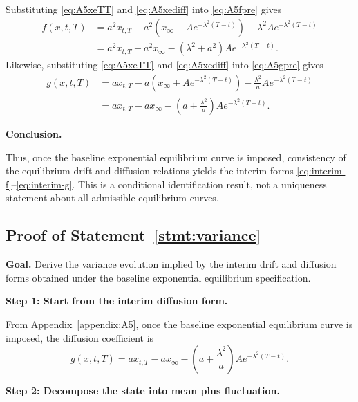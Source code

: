 \documentclass[12pt]{article}
\theoremstyle{statementstyle}
\begin{document}
\begin{appendices}
Substituting \eqref{eq:A5xeTT} and \eqref{eq:A5xediff} into
\eqref{eq:A5fpre} gives
\begin{align}
f(x,t,T)
&=
a^{2}x_{t,T}
-
a^{2}\!\left(x_{\infty}+A e^{-\lambda^{2}(T-t)}\right)
-
\lambda^{2}A e^{-\lambda^{2}(T-t)}
\nonumber\\
&=
a^{2}x_{t,T}
-
a^{2}x_{\infty}
-
(\lambda^{2}+a^{2})A e^{-\lambda^{2}(T-t)}.
\tag{A.5.6}\label{eq:A51}
\end{align}
Likewise, substituting \eqref{eq:A5xeTT} and \eqref{eq:A5xediff} into
\eqref{eq:A5gpre} gives
\begin{align}
g(x,t,T)
&=
a x_{t,T}
-
a\!\left(x_{\infty}+A e^{-\lambda^{2}(T-t)}\right)
-
\frac{\lambda^{2}}{a}A e^{-\lambda^{2}(T-t)}
\nonumber\\
&=
a x_{t,T}
-
a x_{\infty}
-
\left(a+\frac{\lambda^{2}}{a}\right)
A e^{-\lambda^{2}(T-t)}.
\tag{A.5.7}\label{eq:A52}
\end{align}

\medskip
\noindent\textbf{Conclusion.}

Thus, once the baseline exponential equilibrium curve is imposed,
consistency of the equilibrium drift and diffusion relations yields the
interim forms \eqref{eq:interim-f}--\eqref{eq:interim-g}. This is a
conditional identification result, not a uniqueness statement about all
admissible equilibrium curves.

\subsection{Proof of Statement~\ref{stmt:variance}}
\label{appendix:A6}

\textbf{Goal.}
Derive the variance evolution implied by the interim drift and diffusion
forms obtained under the baseline exponential equilibrium specification.

\medskip
\noindent\textbf{Step 1: Start from the interim diffusion form.}

From Appendix~\ref{appendix:A5}, once the baseline exponential
equilibrium curve is imposed, the diffusion coefficient is
\begin{equation}
g(x,t,T)
=
a x_{t,T}
-
a x_{\infty}
-
\left(a+\frac{\lambda^{2}}{a}\right)
A e^{-\lambda^{2}(T-t)}.
\tag{A.6.1}\label{eq:A61}
\end{equation}

\medskip
\noindent\textbf{Step 2: Decompose the state into mean plus fluctuation.}


\end{appendices}
\end{document}

